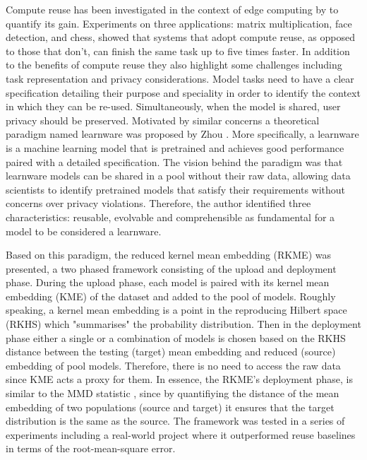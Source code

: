 \documentclass{mpaper}
\begin{document}
Compute reuse has been investigated in the context of edge computing by \cite{ComputeReuse} to quantify its gain. Experiments on three applications: matrix multiplication, face detection, and chess, showed that systems that adopt compute reuse, as opposed to those that don't, can finish the same task up to five times faster. In addition to the benefits of compute reuse they also highlight some challenges including task representation and privacy considerations. Model tasks need to have a clear specification detailing their purpose and speciality in order to identify the context in which they can be re-used. Simultaneously, when the model is shared, user privacy should be preserved. Motivated by similar concerns a theoretical paradigm named learnware was proposed by Zhou \cite{Learnware}. More specifically, a learnware is a machine learning model that is pretrained and achieves good performance paired with a detailed specification. The vision behind the paradigm was that learnware models can be shared in a pool without their raw data, allowing data scientists to identify pretrained models that satisfy their requirements without concerns over privacy violations. Therefore, the author identified three characteristics: reusable, evolvable and comprehensible as fundamental for a model to be considered a learnware.  

Based on this paradigm, the reduced kernel mean embedding (RKME) \cite{KernelMMD} was presented, a two phased framework consisting of the upload and deployment phase. During the upload phase, each model is paired with its kernel mean embedding (KME) of the dataset and added to the pool of models. Roughly speaking, a kernel mean embedding is a point in the reproducing Hilbert space (RKHS) which "summarises" the probability distribution. Then in the deployment phase either a single or a combination of models is chosen based on the RKHS distance between the testing (target) mean embedding and reduced (source) embedding of pool models. Therefore, there is no need to access the raw data since KME acts a proxy for them. In essence, the RKME's deployment phase, is similar to the MMD statistic \cite{OriginalMMD}, since by quantifiying the distance of the mean embedding of two populations (source and target) it ensures that the target distribution is the same as the source. The framework was tested in a series of experiments including a real-world project where it outperformed reuse baselines in terms of the root-mean-square error.
\end{document}
